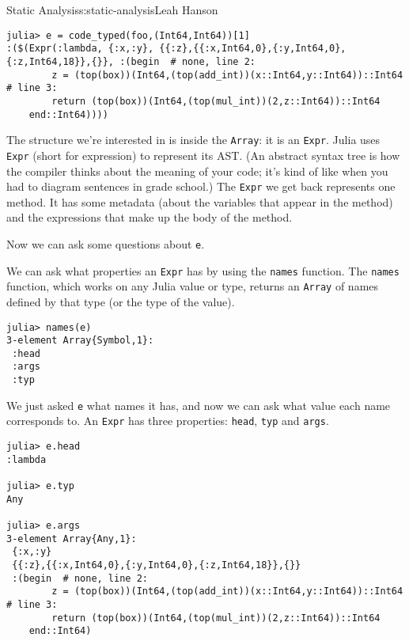 \begin{aosachapter}{Static Analysis}{s:static-analysis}{Leah Hanson}
\begin{verbatim}
julia> e = code_typed(foo,(Int64,Int64))[1]
:($(Expr(:lambda, {:x,:y}, {{:z},{{:x,Int64,0},{:y,Int64,0},{:z,Int64,18}},{}}, :(begin  # none, line 2:
        z = (top(box))(Int64,(top(add_int))(x::Int64,y::Int64))::Int64 # line 3:
        return (top(box))(Int64,(top(mul_int))(2,z::Int64))::Int64
    end::Int64))))
\end{verbatim}

The structure we're interested in is inside the \texttt{Array}: it is an
\texttt{Expr}. Julia uses \texttt{Expr} (short for expression) to
represent its AST. (An abstract syntax tree is how the compiler thinks
about the meaning of your code; it's kind of like when you had to
diagram sentences in grade school.) The \texttt{Expr} we get back
represents one method. It has some metadata (about the variables that
appear in the method) and the expressions that make up the body of the
method.

Now we can ask some questions about \texttt{e}.

We can ask what properties an \texttt{Expr} has by using the
\texttt{names} function. The \texttt{names} function, which works on any
Julia value or type, returns an \texttt{Array} of names defined by that
type (or the type of the value).

\begin{verbatim}
julia> names(e)
3-element Array{Symbol,1}:
 :head
 :args
 :typ 
\end{verbatim}

We just asked \texttt{e} what names it has, and now we can ask what
value each name corresponds to. An \texttt{Expr} has three properties:
\texttt{head}, \texttt{typ} and \texttt{args}.

\begin{verbatim}
julia> e.head
:lambda

julia> e.typ
Any

julia> e.args
3-element Array{Any,1}:
 {:x,:y}                                                                                                                                                                                     
 {{:z},{{:x,Int64,0},{:y,Int64,0},{:z,Int64,18}},{}}                                                                                                                                         
 :(begin  # none, line 2:
        z = (top(box))(Int64,(top(add_int))(x::Int64,y::Int64))::Int64 # line 3:
        return (top(box))(Int64,(top(mul_int))(2,z::Int64))::Int64
    end::Int64)
\end{verbatim}


\end{aosachapter}
